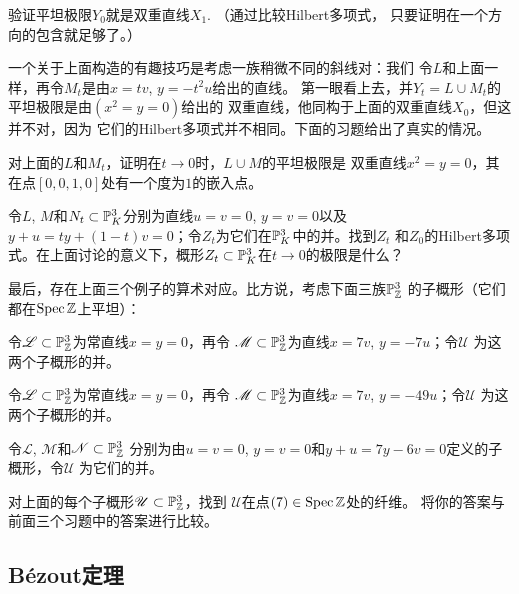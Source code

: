 \begin{exe}\label{exe:3.67}
验证平坦极限$Y_0$就是双重直线$X_1$. （通过比较Hilbert多项式，
只要证明在一个方向的包含就足够了。）
\end{exe}

\nottran

一个关于上面构造的有趣技巧是考虑一族稍微不同的斜线对：我们
令$L$和上面一样，再令$M_t$是由$x=tv$, $y=-t^2u$给出的直线。
第一眼看上去，并$Y_t=L\cup M_t$的平坦极限是由$(x^2=y=0)$给出的
双重直线，他同构于上面的双重直线$X_0$，但这并不对，因为
它们的Hilbert多项式并不相同。下面的习题给出了真实的情况。

\begin{exe}\label{exe:3.68}
对上面的$L$和$M_t$，证明在$t\to 0$时，$L\cup M$的平坦极限是
双重直线$x^2=y=0$，其在点$[0,0,1,0]$处有一个度为$1$的嵌入点。
\end{exe}


\begin{exe}\label{exe:3.69}
令$L$, $M$和$N_t\subset \P_K^3$分别为直线$u=v=0$, $y=v=0$以及
$y+u=ty+(1-t)v=0$；令$Z_t$为它们在$\P_K^3$中的并。找到$Z_t$
和$Z_0$的Hilbert多项式。在上面讨论的意义下，概形$Z_t\subset 
\P_K^3$在$t\to 0$的极限是什么？
\end{exe}


最后，存在上面三个例子的算术对应。比方说，考虑下面三族$\P_\zz^3$
的子概形（它们都在$\spec \zz$上平坦）：
\begin{compactenum}[(a)]
\item 令$\mathscr L\subset \P_\zz^3$为常直线$x=y=0$，再令
$\mathscr M\subset \P_\zz^3$为直线$x=7v$, $y=-7u$；令$\mathscr U$
为这两个子概形的并。
\item 令$\mathscr L\subset \P_\zz^3$为常直线$x=y=0$，再令
$\mathscr M\subset \P_\zz^3$为直线$x=7v$, $y=-49u$；令$\mathscr U$
为这两个子概形的并。
\item 令$\mathscr L$, $\mathscr M$和$\mathscr N\subset \P_\zz^3$
分别为由$u=v=0$, $y=v=0$和$y+u=7y-6v=0$定义的子概形，令$\mathscr U$
为它们的并。
\end{compactenum}

\begin{exe}\label{exe:3.70}
对上面的每个子概形$\mathscr U\subset \P_\zz^3$，找到
$\mathscr U$在点$(7)\in\spec \zz$处的纤维。
将你的答案与前面三个习题中的答案进行比较。
\end{exe}

\subsection{B\texorpdfstring{\'{e}}{é}zout定理}
\label{s:3.3.5}

